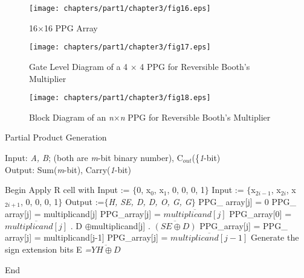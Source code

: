 \begin{figure}[!tbh]
	\centering
	\texttt{[image: chapters/part1/chapter3/fig16.eps]}
	\caption{{16$\times $16} PPG Array}
	\label{fig:p1_c3_fig16}
\end{figure}

\begin{figure}[!tbh]
	\centering
	\texttt{[image: chapters/part1/chapter3/fig17.eps]}
	\caption{Gate Level Diagram of a {4 $\times$ 4} PPG for Reversible Booth's Multiplier}
	\label{fig:p1_c3_fig17}
\end{figure}

\begin{figure}[!tbh]
	\centering
	\texttt{[image: chapters/part1/chapter3/fig18.eps]}
	\caption{Block Diagram of an \textit{n$\times $n} PPG for Reversible Booth's Multiplier}
	\label{fig:p1_c3_fig18}
\end{figure}
\begin{algorithm}[!h]
	\caption{Partial Product Generation}
	\label{alg:part1_c3_alg1}
	Input: { {\it A, B}; (both are {\it m}-bit binary number), C${}_{out}$(\{\it1}-bit)\\
	Output: { { Sum({\it m}-bit), Carry({\it 1}-bit)}}
	\begin{algorithmic}[1]
		
		\STATE Begin
		\STATE Apply R cell with
		\STATE Input := $\mathrm{\{}$0, x${}_{0}$, x${}_{1}$, 0, 0, 0, 1$\mathrm{\}}$
		\ELSE 
		\STATE Input := $\mathrm{\{}$x${}_{2i-1}$, x${}_{2i}$, x${}_{2i+1}$, 0, 0, 0, 1$\mathrm{\}}$
		\ENDIF
		\STATE Output :=$\mathrm{\{}$\textit{H, SE, D, D, O, G, G}$\mathrm{\}}$
		\STATE PPG\_ array[j] = 0
  \ENDFOR
\ELSE
{}
\STATE PPG\_ array[j] = multiplicand[j]
\ENDFOR
\ELSE
{} 
\STATE PPG\_array[j] = $\overline{multiplicand[j]}$
\ENDFOR
\ENDIF
\ELSE 
\STATE PPG\_array[0] =$\overline{multiplicand[j]}$ . D $\oplus $multiplicand[j] . $\overline{(SE\oplus D)}$
\STATE PPG\_array[j] = PPG\_ array[j] = multiplicand[j-1]
\ENDFOR
\ELSE 
{} 
\STATE PPG\_array[j] = $\overline{multiplicand[j-1]}$
\ENDFOR
\ENDIF
 \ENDIF  
\ENDIF
 \STATE Generate the sign extension bits E\textit{ =}$\overline{YH\oplus D}$
		
\ENDFOR
	
		\STATE End
	\end{algorithmic}
\end{algorithm}


